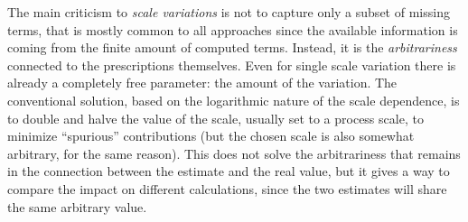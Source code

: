 The main criticism to \textit{scale variations} is not to capture only a subset
of missing terms, that is mostly common to all approaches since the available
information is coming from the finite amount of computed terms.
Instead, it is the \textit{arbitrariness} connected to the prescriptions
themselves.
%
Even for single scale variation there is already a completely free parameter:
the amount of the variation.
%
The conventional solution, based on the logarithmic nature of the scale
dependence, is to double and halve the value of the scale, usually set to a
process scale, to minimize \enquote{spurious} contributions (but the chosen
scale is also somewhat arbitrary, for the same reason).
%
This does not solve the arbitrariness that remains in the connection between
the estimate and the real value, but it gives a way to compare the impact on
different calculations, since the two estimates will share the same arbitrary
value.
